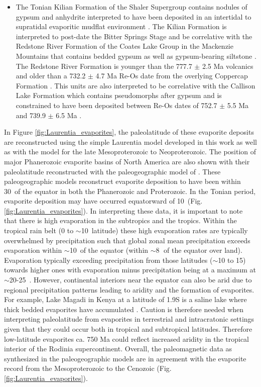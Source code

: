 \documentclass[twocolumn, switch]{article} %
\begin{document}
\begin{itemize}
\item The Tonian Kilian Formation of the Shaler Supergroup contains nodules of gypsum and anhydrite interpreted to have been deposited in an intertidal to supratidal evaporitic mudflat environment \citep{Prince2014a}. The Kilian Formation is interpreted to post-date the Bitter Springs Stage and be correlative with the Redstone River Formation of the Coates Lake Group in the Mackenzie Mountains that contains bedded gypsum as well as gypsum-bearing siltstone \citep{Jefferson1989a, Jones2010a}. The Redstone River Formation is younger than the 777.7 $\pm$ 2.5 Ma volcanics and older than a 732.2 $\pm$ 4.7 Ma Re-Os date from the overlying Coppercap Formation \citep{Rooney2014a}. This units are also interpreted to be correlative with the Callison Lake Formation which contains pseudomorphs after gypsum and is constrained to have been deposited between Re-Os dates of 752.7 $\pm$ 5.5 Ma and 739.9 $\pm$ 6.5 Ma \citep{Strauss2015a}.
\end{itemize}

In Figure \ref{fig:Laurentia_evaporites}, the paleolatitude of these evaporite deposits are reconstructed using the simple Laurentia model developed in this work as well as with the \cite{Li2013a} model for the late Mesoproterozoic to Neoproterozoic. The position of major Phanerozoic evaporite basins of North America are also shown with their paleolatitude reconstructed with the paleogeographic model of \cite{Torsvik2017a}. These paleogeographic models reconstruct evaporite deposition to have been within 30\textdegree\ of the equator in both the Phanerozoic and Proterozoic. In the Tonian period, evaporite deposition may have occurred equatorward of 10\textdegree\ (Fig. \ref{fig:Laurentia_evaporites}). In interpreting these data, it is important to note that there is high evaporation in the subtropics and the tropics. Within the tropical rain belt (0 to $\sim$10\textdegree\ latitude) these high evaporation rates are typically overwhelmed by precipitation such that global zonal mean precipitation exceeds evaporation within $\sim$10\textdegree\ of the equator (within $\sim$8\textdegree$\;$ of the equator over land). Evaporation typically exceeding precipitation from those latitudes ($\sim$10 to 15\textdegree) towards higher ones with evaporation minus precipitation being at a maximum at $\sim$20-25\textdegree\ \citep{Park2020b}. However, continental interiors near the equator can also be arid due to regional precipitation patterns leading to aridity and the formation of evaporites. For example, Lake Magadi in Kenya at a latitude of 1.9\textdegree S is a saline lake where thick bedded evaporites have accumulated \citep{Eugster1980a}. Caution is therefore needed when interpreting paleolatitude from evaporites in terrestrial and intracratonic settings given that they could occur both in tropical and subtropical latitudes. Therefore low-latitude evaporites ca. 750 Ma could reflect increased aridity in the tropical interior of the Rodinia supercontinent. Overall, the paleomagnetic data as synthesized in the paleogeographic models are in agreement with the evaporite record from the Mesoproterozoic to the Cenozoic (Fig. \ref{fig:Laurentia_evaporites}).
\end{document}

